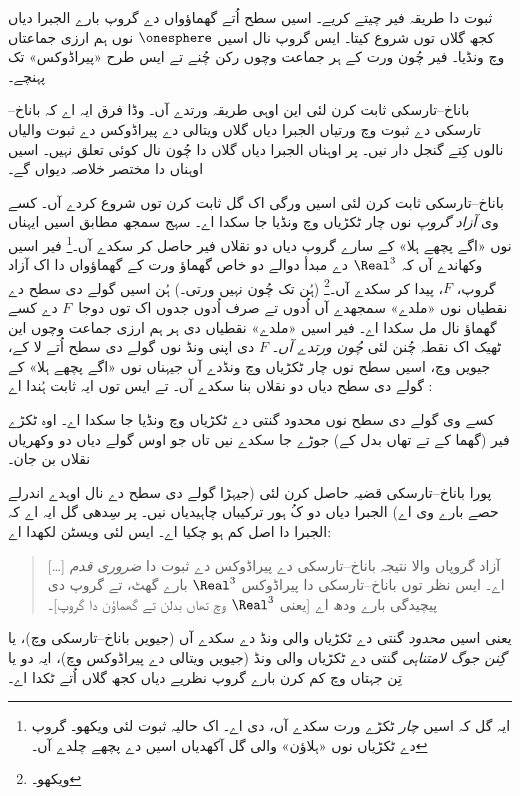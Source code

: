 \documentclass[../../../include/open-logic-section]{subfiles}
\begin{document}
ثبوت دا طریقہ فیر چیتے کریے۔ اسیں سطح اُتے گھماؤواں دے گروپ بارے الجبرا دیاں کجھ گلاں توں شروع کیتا۔ ایس گروپ نال اسیں $\onesphere$ نوں ہم ارزی جماعتاں وچ ونڈیا۔ فیر چُون ورت کے ہر جماعت وچوں رکن چُنے تے ایس طرح «پیراڈوکس» تک پہنچے۔

باناخ–تارسکی ثابت کرن لئی این اوہی طریقہ ورتدے آں۔ وڈا فرق ایہ اے کہ باناخ–تارسکی دے ثبوت وچ ورتیاں الجبرا دیاں گلاں ویتالی دے پیراڈوکس دے ثبوت والیاں نالوں کِتے گنجل دار نیں۔ پر اوہناں الجبرا دیاں گلاں دا چُون نال کوئی تعلق نہیں۔ اسیں اوہناں دا مختصر خلاصہ دیواں گے۔

باناخ–تارسکی ثابت کرن لئی اسیں  ورگی اک گل ثابت کرن توں شروع کردے آں۔ کسے وی \emph{آزاد گروپ} نوں چار ٹکڑیاں وچ ونڈیا جا سکدا اے۔ سہج سمجھ مطابق اسیں ایہناں نوں «اگے پچھے ہلا» کے سارے گروپ دیاں دو نقلاں فیر حاصل کر سکدے آں۔\footnote{ایہ گل کہ اسیں \emph{چار} ٹکڑے ورت سکدے آں، \cite{Robinson1947} دی اے۔ اک حالیہ ثبوت لئی \citet[Theorem 5.2]{Wagon2016} ویکھو۔ گروپ دے ٹکڑیاں نوں «ہلاؤن» والی گل آکھدیاں اسیں \citet[p.~3]{Weston2003} دے پچھے چلدے آں۔} فیر اسیں وکھاندے آں کہ $\Real^3$ دے مبدأ دوالے دو خاص گھماؤ ورت کے گھماؤواں دا اک آزاد گروپ، $F$، پیدا کر سکدے آں۔\footnote{\citet[Theorem 2.1]{Wagon2016} ویکھو۔} (ہُن تک چُون نہیں ورتی۔) ہُن اسیں گولے دی سطح دے نقطیاں نوں «ملدے» سمجھدے آں اُدوں تے صرف اُدوں جدوں اک توں دوجا~$F$ دے کسے گھماؤ نال مل سکدا اے۔ فیر اسیں «ملدے» نقطیاں دی ہر ہم ارزی جماعت وچوں این ٹھیک اک نقطہ چُنن لئی \emph{چُون ورتدے آں}۔ $F$ دی اپنی ونڈ نوں گولے دی سطح اُتے لا کے، جیویں  وچ، اسیں سطح نوں چار ٹکڑیاں وچ ونڈدے آں جیہناں نوں «اگے پچھے ہلا» کے گولے دی سطح دیاں دو نقلاں بنا سکدے آں۔ تے ایس توں ایہ ثابت ہُندا اے \citep{Hausdorff1914}:

\begin{thm}
کسے وی گولے دی سطح نوں محدود گنتی دے ٹکڑیاں وچ ونڈیا جا سکدا اے۔ اوہ ٹکڑے فیر (گھما کے تے تھاں بدل کے) جوڑے جا سکدے نیں تاں جو اوس گولے دیاں دو وکھریاں نقلاں بن جان۔
\end{thm}

پورا باناخ–تارسکی قضیہ حاصل کرن لئی (جیہڑا گولے دی سطح دے نال اوہدے اندرلے حصے بارے وی اے) الجبرا دیاں دو کُ ہور ترکیباں چاہیدیاں نیں۔ پر سِدھی گل ایہ اے کہ الجبرا دا اصل کم ہو چکیا اے۔ ایس لئی ویسٹن لکھدا اے:
\begin{quote}
  [\ldots] آزاد گروپاں والا نتیجہ باناخ–تارسکی دے پیراڈوکس دے ثبوت دا \emph{ضروری قدم} اے۔ ایس نظر توں باناخ–تارسکی دا پیراڈوکس $\Real^3$ بارے گھٹ، تے گروپ دی پیچیدگی بارے ودھ اے [یعنی $\Real^3$ وچ تھاں بدلن تے گھماؤن دا گروپ]۔ \cite[p.~16]{Weston2003}
\end{quote}
یعنی اسیں \emph{محدود} گنتی دے ٹکڑیاں والی ونڈ دے سکدے آں (جیویں باناخ–تارسکی وچ)، یا \emph{گِنن جوگ لامتناہی} گنتی دے ٹکڑیاں والی ونڈ (جیویں ویتالی دے پیراڈوکس وچ)، ایہ دو یا تِن جہتاں وچ کم کرن بارے گروپ نظریے دیاں کجھ گلاں اُتے ٹکدا اے۔
\end{document}
